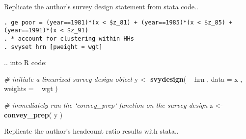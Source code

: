 \documentclass[]{book}
\newenvironment{Shaded}{\begin{snugshade}}{\end{snugshade}}
\newcommand{\KeywordTok}[1]{\textcolor[rgb]{0.13,0.29,0.53}{\textbf{{#1}}}}
\newcommand{\DataTypeTok}[1]{\textcolor[rgb]{0.13,0.29,0.53}{{#1}}}
\newcommand{\StringTok}[1]{\textcolor[rgb]{0.31,0.60,0.02}{{#1}}}
\newcommand{\CommentTok}[1]{\textcolor[rgb]{0.56,0.35,0.01}{\textit{{#1}}}}
\newcommand{\NormalTok}[1]{{#1}}
\theoremstyle{definition}
\theoremstyle{definition}
\theoremstyle{remark}
\begin{document}
Replicate the author's survey design statement from stata code..

\begin{verbatim}
. ge poor = (year==1981)*(x < $z_81) + (year==1985)*(x < $z_85) +  (year==1991)*(x < $z_91)
. * account for clustering within HHs 
. svyset hrn [pweight = wgt]
\end{verbatim}

.. into R code:

\begin{Shaded}
\begin{Highlighting}[]
\CommentTok{# initiate a linearized survey design object}
\NormalTok{y <-}\StringTok{ }\KeywordTok{svydesign}\NormalTok{( ~}\StringTok{ }\NormalTok{hrn , }\DataTypeTok{data =} \NormalTok{x , }\DataTypeTok{weights =} \NormalTok{~}\StringTok{ }\NormalTok{wgt )}

\CommentTok{# immediately run the `convey_prep` function on the survey design}
\NormalTok{z <-}\StringTok{ }\KeywordTok{convey_prep}\NormalTok{( y )}
\end{Highlighting}
\end{Shaded}

Replicate the author's headcount ratio results with stata..
\end{document}
